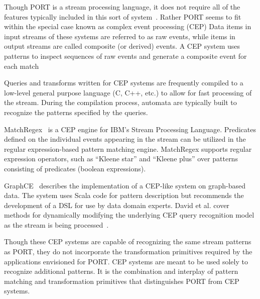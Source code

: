 Though PORT is a stream processing language, it does not
require all of the features typically
included in this sort of system~\cite{DBLP:journals/csur/DayarathnaP18}.
Rather PORT seems to fit within the special case
known as complex event processing (CEP)
Data items in input streams of these systems are referred to as raw events, while items in output streams are called
composite (or derived) events. A CEP system uses patterns to inspect
sequences of raw events and generate a composite event for each
match~\cite{DBLP:journals/ibmrd/HirzelAGJKKMNSSW13}

Queries and transforms written for CEP systems are
frequently compiled to a low-level general purpose language (C, C++, etc.) to allow for fast
processing of the stream. During the compilation process, automata are typically
built to recognize the patterns specified by the queries.

MatchRegex~\cite{DBLP:conf/debs/Hirzel12} is a CEP engine for IBM’s Stream Processing
Language. Predicates defined on the individual events appearing in the
stream can be utilized in the regular expression-based pattern matching
engine. MatchRegex supports regular expression operators, such as “Kleene star”
and “Kleene plus” over patterns consisting of predicates (boolean expressions).

GraphCE~\cite{DBLP:conf/models/BarqueroBTV18} describes the implementation of a CEP-like system on graph-based data. The system uses Scala code for pattern description but recommends the development of a DSL for use by data domain experts.
David et al. cover methods for dynamically modifying the underlying CEP query recognition model as the stream is being processed~\cite{DBLP:journals/sosym/DavidRV18}.

Though these CEP systems are capable
of recognizing the same stream patterns as PORT, they
do not incorporate the
transformation primitives
required by the applications
envisioned for PORT. CEP systems are meant
to be used solely to recognize additional patterns.
It is the combination and interplay of pattern matching and transformation
primitives that distinguishes PORT from CEP systems.


